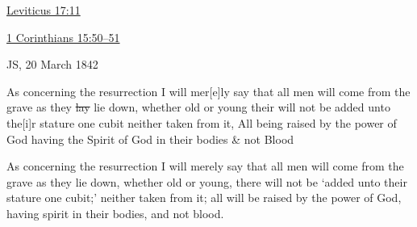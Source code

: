		\begin{compactitem}
			\item \hyperref[LEVITICUS-17-11]{Leviticus 17:11}
			\item \hyperref[1CORINTHIANS-15-50]{1 Corinthians 15:50--51}
			\item JS, 20 March 1842
				\begin{compactitem}
					\item[{\hyperref[EMS-1842-JS-20-MAR-1842-WW]{WW version}}] As concerning the resurrection I will mer[e]ly say that all men will come from the grave as they \sout{lay} lie down, whether old or young their will not be added unto the[i]r stature one cubit neither taken from it, All being raised by the power of God having the Spirit of God in their bodies \& not Blood
					\item[{\hyperref[EMS-1842-JS-20-MAR-1842-TS]{TS version}}] As concerning the resurrection I will merely say that all men will come from the grave as they lie down, whether old or young, there will not be `added unto their stature one cubit;' neither taken from it; all will be raised by the power of God, having spirit in their bodies, and not blood.
				\end{compactitem}
		\end{compactitem}